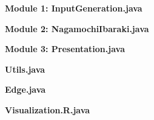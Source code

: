 \documentclass[12pt,letterpaper,titlepage,en-US]{article}
\begin{document}
\textbf{Module 1: InputGeneration.java}


\pagebreak
\textbf{Module 2: NagamochiIbaraki.java}


\pagebreak
\textbf{Module 3: Presentation.java}


\pagebreak
\textbf{Utils.java}


\textbf{Edge.java}


\textbf{Visualization.R.java}

\end{document}
